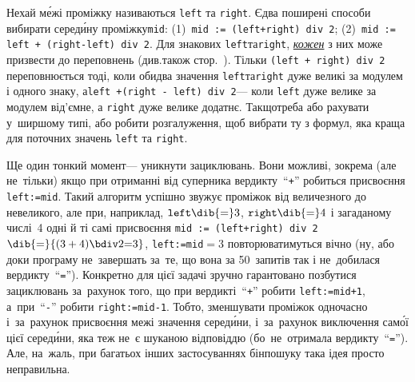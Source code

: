{\sloppy

Нехай м\'{е}жі проміжку називаються 
\verb"left" та \verb"right".
Є\nolinebreak[3] два поширені способи вибирати серед\'{и}ну проміжку\nolinebreak[3] \verb"mid":
(1)~\verb"mid := (left+right) div 2";\hspace{0.25em plus 2em}
(2)~\verb"mid := left + (right-left) div 2".
%
Для знакових \verb"left"\nolinebreak[2] та\nolinebreak[3] \verb"right",
\underline{\emph{кожен}} з них може призвести до переповнень
(див.\nolinebreak[3] також стор.~\pageref{text:overflow-example}).
Тільки \verb"(left + right) div 2" переповнюється тоді, 
коли обидва значення \verb"left"\nolinebreak[2] та\nolinebreak[3] \verb"right"
дуже великі за модулем і одного знаку,
а\nolinebreak[2] \verb"left +"\nolinebreak[2] \verb"(right - left) div 2"\nolinebreak[3] --- 
коли \verb"left" дуже велике за модулем від'ємне, а \verb"right" дуже велике додатнє.\label{text:binsearch-fails-examples} 
Так\nolinebreak[3] що\nolinebreak[2] треба або рахувати у~ширшому типі, %
або робити розгалуження, щоб вибрати 
ту з формул, яка краща для поточних значень \texttt{left} та \texttt{right}.

Ще один тонкий момент\nolinebreak[3] --- уникнути зациклювань.
Вони можливі, зокрема (але не~тільки) якщо при отриманні від суперника вердикту~``\verb"+"''
робиться присвоєння \texttt{left:=mid}. 
Такий алгоритм успішно звужує проміжок від величезного до невеликого, 
але при, наприклад, $\texttt{left}\dib{{=}}3$, $\texttt{right}\dib{{=}}4$ 
і загаданому числі~4 одні й ті самі присвоєння 
\verb"mid := (left+right) div 2"${}\dib{{=}}{{(3+4)\bdiv2}{=}3}$,
\verb"left:=mid"${}{=}3$ повторюватимуться вічно 
(ну, або доки програму не~завершать за~те, 
що вона за 50~запитів так і не~добилася вердикту~``\verb"="'').
Конкретно для цієї задачі зручно гарантовано позбутися зациклювань за~рахунок того, 
що при вердикті~``\verb"+"'' робити \verb"left:=mid+1", 
а~при~``\verb"-"'' робити \verb"right:=mid-1".
Тобто, зменшувати проміжок одночасно і~за~рахунок присвоєння межі значення серед\'{и}ни, 
і~за~рахунок виключення сам\'{о}ї цієї серед\'{и}ни, яка теж не~є шуканою відповіддю
(бо~не~отримала вердикту~``\verb"="'').
Але, на~жаль, при багатьох інших застосуваннях бінпошуку така ідея просто неправильна.

}
